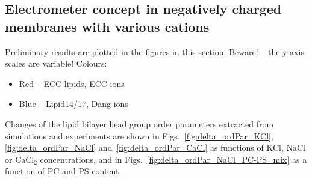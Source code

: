\documentclass[journal=jpcbfk,manuscript=article]{achemso}
\begin{document}
 

 
 
\subsection{Electrometer concept in negatively charged membranes with various cations} 
 
Preliminary results are plotted in the figures in this section. 
Beware! -- the y-axis scales are variable!
Colours:
\begin{itemize}
  \item Red -- ECC-lipids, ECC-ions
  \item Blue -- Lipid14/17, Dang ions
\end{itemize}

Changes of the lipid bilayer head group order parameters extracted from simulations and 
experiments \cite{roux90} are shown in Figs.~\ref{fig:delta_ordPar_KCl}, \ref{fig:delta_ordPar_NaCl} 
and~\ref{fig:delta_ordPar_CaCl} as functions of KCl, NaCl or CaCl$_2$ concentrations,
and in Figs.~\ref{fig:delta_ordPar_NaCl_PC-PS_mix} as a function of PC and PS content. 
\end{document}
